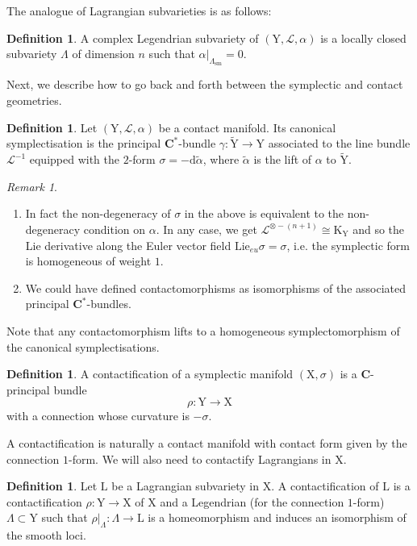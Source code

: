 \documentclass{article}
\theoremstyle{plain}
\theoremstyle{definition}
\newtheorem{definition}[theorem]{Definition}
\theoremstyle{remark}
\newtheorem{remark}[theorem]{Remark}
\newcommand{\mr}{\mathrm}
\newcommand{\C}{\mathbf C}
\newcommand{\3}{\vspace{3mm}}
\newcommand{\2}{\vspace{2mm}}
\newcommand{\1}{\vspace{1mm}}
\begin{document}
The analogue of Lagrangian subvarieties is as follows:
\2
\begin{definition}
A complex Legendrian subvariety of $(\mr{Y},\mathscr{L},\alpha)$ is a locally closed subvariety $\Lambda$ of dimension $n$ such that $\alpha|_{\Lambda_\mr{sm}}=0$.
\end{definition}
Next, we describe how to go back and forth between the symplectic and contact geometries.
\2
\begin{definition}
Let $(\mr{Y},\mathscr{L},\alpha)$ be a contact manifold. Its canonical symplectisation is the principal $\C^*$-bundle $\gamma: \tilde{\mr{Y}}\to \mr{Y}$ associated to the line bundle $\mathscr{L}^{-1}$ equipped with the $2$-form $\sigma = -\mr{d}\tilde{\alpha}$, where $\tilde{\alpha}$ is the lift of $\alpha$ to $\tilde{\mr{Y}}$.
\end{definition}
\2
\begin{remark}
\begin{enumerate}
\item In fact the non-degeneracy of $\sigma$ in the above is equivalent to the non-degeneracy condition on $\alpha$. In any case, we get $\mathscr{L}^{\otimes -(n+1)}\cong \mr{K}_\mr{Y}$ and so the Lie derivative along the Euler vector field $\mr{Lie}_{eu}\sigma=\sigma$, i.e. the symplectic form is homogeneous of weight $1$.
\item We could have defined contactomorphisms as isomorphisms of the associated principal $\C^*$-bundles.
\end{enumerate}
\end{remark}
Note that any contactomorphism lifts to a homogeneous symplectomorphism of the canonical symplectisations.
\2
\begin{definition}
A contactification of a symplectic manifold $(\mr{X},\sigma)$ is a $\C$-principal bundle $$\rho:\mr{Y}\to \mr{X}$$ with a connection whose curvature is $-\sigma$. 
\end{definition}
A contactification is naturally a contact manifold with contact form given by the connection $1$-form. We will also need to contactify Lagrangians in $\mr{X}$. 
\2
\begin{definition}
Let $\mr{L}$ be a Lagrangian subvariety in $\mr{X}$. A contactification of $\mr{L}$ is a contactification $\rho:\mr{Y}\to \mr{X}$ of $\mr{X}$ and a Legendrian (for the connection $1$-form) $\Lambda \subset\mr{Y}$ such that $\rho|_\Lambda:\Lambda	\to \mr{L}$ is a homeomorphism and induces an isomorphism of the smooth loci.
\end{definition}
\end{document}
